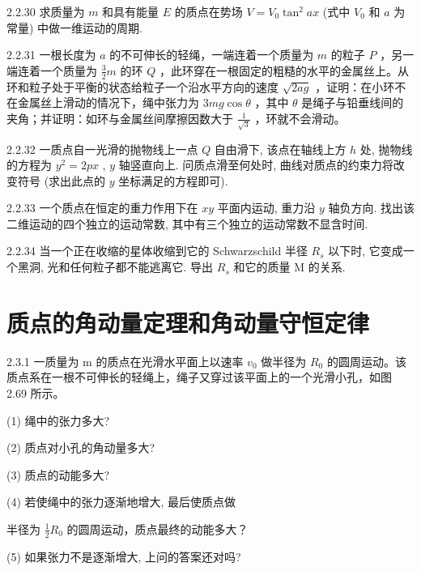 \begin{problem}{2.2.30}
求质量为 $m$ 和具有能量 $E$ 的质点在势场 $V = V_{0}\tan^{2}ax$ (式中 $V_{0}$ 和 $a$ 为常量) 中做一维运动的周期.
\end{problem}
\clearpage


\begin{problem}{2.2.31}
一根长度为 $a$ 的不可伸长的轻绳，一端连着一个质量为 $m$ 的粒子 $P$ ，另一端连着一个质量为 $\frac{3}{2} m$ 的环 $Q$ ，此环穿在一根固定的粗糙的水平的金属丝上。从环和粒子处于平衡的状态给粒子一个沿水平方向的速度 $\sqrt{2ag}$ ，证明：在小环不在金属丝上滑动的情况下，绳中张力为 $3mg\cos \theta$ ，其中 $\theta$ 是绳子与铅垂线间的夹角；并证明：如环与金属丝间摩擦因数大于 $\frac{1}{\sqrt{3}}$ ，环就不会滑动。
\end{problem}
\clearpage


\begin{problem}{2.2.32}
一质点自一光滑的抛物线上一点 $Q$ 自由滑下, 该点在轴线上方 $h$ 处, 抛物线的方程为 $y^{2} = 2px$ , $y$ 轴竖直向上. 问质点滑至何处时, 曲线对质点的约束力将改变符号 (求出此点的 $y$ 坐标满足的方程即可).
\end{problem}
\clearpage


\begin{problem}{2.2.33}
一个质点在恒定的重力作用下在 $xy$ 平面内运动, 重力沿 $y$ 轴负方向. 找出该二维运动的四个独立的运动常数, 其中有三个独立的运动常数不显含时间.
\end{problem}
\clearpage


\begin{problem}{2.2.34}
当一个正在收缩的星体收缩到它的 Schwarzschild 半径 $R_{s}$ 以下时, 它变成一个黑洞, 光和任何粒子都不能逃离它. 导出 $R_{s}$ 和它的质量 M 的关系.
\end{problem}
\clearpage


\section{质点的角动量定理和角动量守恒定律}

\begin{problem}{2.3.1}
一质量为 m 的质点在光滑水平面上以速率 $v_{0}$ 做半径为 $R_{0}$ 的圆周运动。该质点系在一根不可伸长的轻绳上，绳子又穿过该平面上的一个光滑小孔，如图 2.69 所示。

(1) 绳中的张力多大?

(2) 质点对小孔的角动量多大?

(3) 质点的动能多大?

(4) 若使绳中的张力逐渐地增大, 最后使质点做

半径为 $\frac{1}{2} R_0$ 的圆周运动，质点最终的动能多大？

(5) 如果张力不是逐渐增大, 上问的答案还对吗?
\begin{center}

\end{center}
\end{problem}
\clearpage


